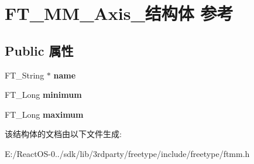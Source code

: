 \hypertarget{struct_f_t___m_m___axis__}{}\section{F\+T\+\_\+\+M\+M\+\_\+\+Axis\+\_\+结构体 参考}
\label{struct_f_t___m_m___axis__}
\subsection*{Public 属性}
\begin{DoxyCompactItemize}
\item 
\mbox{\label{struct_f_t___m_m___axis___a5c784efa44906c0e2b715eb1f866a09f}} 
F\+T\+\_\+\+String $\ast$ {\bfseries name}
\item 
\mbox{\label{struct_f_t___m_m___axis___a9dc31f02b350b1356e0896673b5b73a4}} 
F\+T\+\_\+\+Long {\bfseries minimum}
\item 
\mbox{\label{struct_f_t___m_m___axis___addac1f8e71da1bedea9b393ae2751881}} 
F\+T\+\_\+\+Long {\bfseries maximum}
\end{DoxyCompactItemize}


该结构体的文档由以下文件生成\+:\begin{DoxyCompactItemize}
\item 
E\+:/\+React\+O\+S-\/0../sdk/lib/3rdparty/freetype/include/freetype/ftmm.\+h\end{DoxyCompactItemize}
